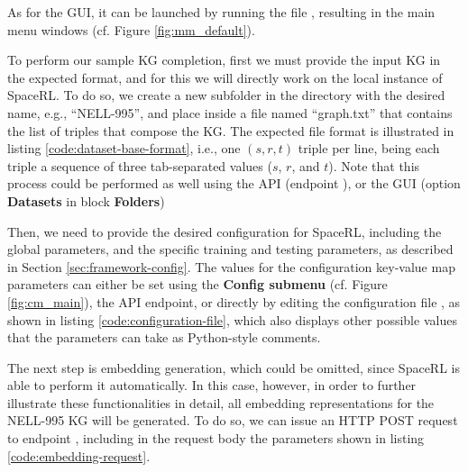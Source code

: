 As for the GUI, it can be launched by running the file , resulting in the main menu windows (cf. Figure \ref{fig:mm_default}).


To perform our sample KG completion, first we must provide the input KG in the expected format, and for this we will directly work on the local instance of SpaceRL. To do so, we create a new subfolder in the  directory with the desired name,  e.g., ``NELL-995'', and place inside a file named ``graph.txt'' that contains the list of triples that compose the KG. The expected file format is illustrated in listing \ref{code:dataset-base-format}, i.e., one $(s,r,t)$ triple per line, being each triple a sequence of three tab-separated values ($s$, $r$, and $t$). Note that this process could be performed as well using the API (endpoint ), or the GUI (option \textbf{Datasets} in block \textbf{Folders})



Then, we need to provide the desired configuration for SpaceRL, including the global parameters, and the specific training and testing parameters, as described in Section \ref{sec:framework-config}. The values for the configuration key-value map parameters can either be set using the \textbf{Config submenu} (cf. Figure \ref{fig:cm_main}), the  API endpoint, or directly by editing the configuration file , as shown in listing \ref{code:configuration-file}, which also displays other possible values that the parameters can take as Python-style comments.



The next step is embedding generation, which could be omitted, since SpaceRL is able to perform it automatically. In this case, however, in order to further illustrate these functionalities in detail, all embedding representations for the NELL-995 KG will be generated. To do so, we can issue an HTTP POST request to endpoint , including in the request body the parameters shown in listing \ref{code:embedding-request}.

